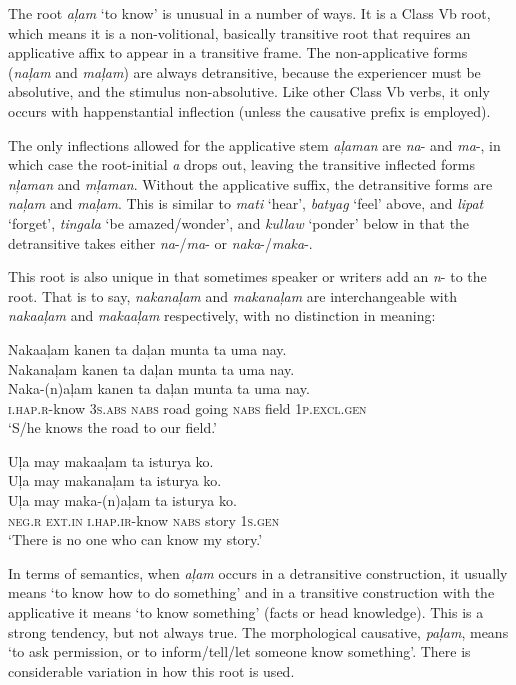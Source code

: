 The root \textit{aļam} ‘to know’ is unusual in a number of ways. It is a Class Vb root, which means it is a non-volitional, basically transitive root that requires an applicative affix to appear in a transitive frame. The non-applicative forms (\textit{naļam} and \textit{maļam}) are always detransitive, because the experiencer must be absolutive, and the stimulus non-absolutive. Like other Class Vb verbs, it only occurs with happenstantial inflection (unless the causative prefix is employed).

The only inflections allowed for the applicative stem \textit{aļaman} are \textit{na}- and \textit{ma}-, in which case the root-initial \textit{a} drops out, leaving the transitive inflected forms \textit{nļaman} and \textit{mļaman}. Without the applicative suffix, the detransitive forms are \textit{naļam} and \textit{maļam}.  This is similar to \textit{mati} `hear', \textit{batyag} `feel' above, and \textit{lipat} `forget', \textit{tingala} `be amazed/wonder', and  \textit{kullaw} `ponder' below in that the detransitive takes either \textit{na}-/\textit{ma}- or \textit{naka}-/\textit{maka}-.


This root is also unique in that sometimes speaker or writers add an \textit{n}- to the root. That is to say, \textit{nakanaļam} and \textit{makanaļam} are interchangeable with \textit{nakaaļam} and \textit{makaaļam} respectively, with no distinction in meaning:

\ea
Nakaaļam kanen	ta	daļan	munta	ta	uma nay. \\
Nakanaļam kanen	ta	daļan	munta	ta	uma nay. \\\smallskip
\gll Naka-(n)aļam	kanen	ta	daļan	munta	ta	uma nay. \\
\textsc{i.hap.r}-know	3\textsc{s.abs}	\textsc{nabs}	road	going	\textsc{nabs}	field	1\textsc{p.excl.gen} \\
\glt ‘S/he knows the road to our field.’
\z

\ea
Uļa	may	makaaļam ta	isturya ko. \\
Uļa	may	makanaļam ta isturya ko. \\\smallskip
\gll Uļa	may	maka-(n)aļam ta	isturya ko. \\
\textsc{neg.r}		\textsc{ext.in}	\textsc{i.hap.ir}-know	\textsc{nabs}	story 1\textsc{s.gen} \\
\glt ‘There is no one who can know my story.’
\z

In terms of semantics, when \textit{aļam} occurs in a detransitive construction, it usually means ‘to know how to do something’ and in a transitive construction with the applicative it means ‘to know something’ (facts or head knowledge). This is a strong tendency, but not always true. The morphological causative, \textit{paļam}, means ‘to ask permission, or to inform/tell/let someone know something’. There is considerable variation in how this root is used.
 
